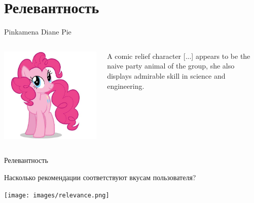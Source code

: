 \documentclass[11pt,aspectratio=169,handout]{beamer}
\begin{document}
\section{Релевантность}

\begin{frame}{Pinkamena Diane Pie}

\begin{columns}
\begin{column}{0.4\textwidth}
   \begin{center}
		\includegraphics[scale=0.25]{images/pony.jpeg}
   \end{center}
\end{column}
\begin{column}{0.55\textwidth}
    \begin{tcolorbox}[colback=info!5,colframe=info!80,title=]
    A comic relief character [...] appears to be the naive party animal of the group, she also displays admirable skill in science and engineering.
    \end{tcolorbox}
\end{column}
\end{columns}

\end{frame}

\begin{frame}{Релевантность}

\begin{tcolorbox}[colback=info!5,colframe=info!80,title=]
Насколько рекомендации соответствуют вкусам пользователя?
\end{tcolorbox}

\begin{center}
\texttt{[image: images/relevance.png]}
\end{center}

\end{frame}
\end{document}
